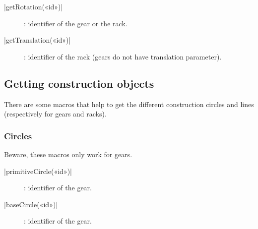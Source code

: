 \documentclass[english]{ltxdoc}
\begin{document}
\begin{colourband}
\commande|getRotation(«id»)|\smallskip{}
\begin{description}
  \item[]:  identifier of the gear or the rack. 
\end{description}
\end{colourband}

\begin{colourband}
\commande|getTranslation(«id»)|\smallskip{}
\begin{description}
  \item[]:  identifier of the  rack (gears do not have
  translation parameter). 
\end{description}
\end{colourband}

\subsection{Getting construction objects}

There are some macros that help to get the different construction circles and
lines (respectively for gears and racks).

\subsubsection{Circles}

Beware, these macros only work for gears.

\begin{colourband}
\commande|primitiveCircle(«id»)|\smallskip{}
\begin{description}
  \item[]:  identifier of the gear. 
\end{description}
\end{colourband}

\begin{colourband}
\commande|baseCircle(«id»)|\smallskip{}
\begin{description}
  \item[]:  identifier of the gear. 
\end{description}
\end{colourband}
\end{document}
